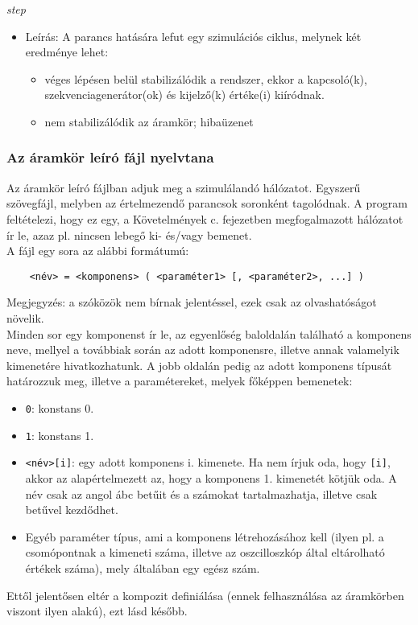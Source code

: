 \textit{step}
\begin{itemize}
	\item Leírás: A parancs hatására lefut egy szimulációs ciklus, melynek két eredménye lehet:
	\begin{itemize}
		\item véges lépésen belül stabilizálódik a rendszer, ekkor a kapcsoló(k), szekvenciagenerátor(ok) és kijelző(k) értéke(i) kiíródnak.
		\item nem stabilizálódik az áramkör; hibaüzenet
	\end{itemize}
\end{itemize}

\subsubsection{Az áramkör leíró fájl nyelvtana}
\label{sec:circuit_def}
Az áramkör leíró fájlban adjuk meg a szimulálandó hálózatot. Egyszerű szövegfájl, melyben az értelmezendő parancsok soronként tagolódnak. A program feltételezi, hogy ez egy, a Követelmények c. fejezetben megfogalmazott hálózatot ír le, azaz pl. nincsen lebegő ki- és/vagy bemenet.\\
A fájl egy sora az alábbi formátumú:
\begin{verbatim}
	<név> = <komponens> ( <paraméter1> [, <paraméter2>, ...] )
\end{verbatim}
Megjegyzés: a szóközök nem bírnak jelentéssel, ezek csak az olvashatóságot növelik.\\

Minden sor egy komponenst ír le, az egyenlőség baloldalán található a komponens neve, mellyel a továbbiak során az adott komponensre, illetve annak valamelyik kimenetére hivatkozhatunk. A jobb oldalán pedig az adott komponens típusát határozzuk meg, illetve a paramétereket, melyek főképpen bemenetek:
\begin{itemize}
	\item \texttt{0}: konstans 0.
	\item \texttt{1}: konstans 1.
	\item \texttt{<név>[i]}: egy adott komponens i. kimenete. Ha nem írjuk oda, hogy \texttt{[i]}, akkor az alapértelmezett az, hogy a komponens 1. kimenetét kötjük oda. A név csak az angol ábc betűit és a számokat tartalmazhatja, illetve csak betűvel kezdődhet.
	\item Egyéb paraméter típus, ami a komponens létrehozásához kell (ilyen pl. a csomópontnak a kimeneti száma, illetve az oszcilloszkóp által eltárolható értékek száma), mely általában egy egész szám.
\end{itemize}
Ettől jelentősen eltér a kompozit definiálása (ennek felhasználása az áramkörben viszont ilyen alakú), ezt lásd később.

